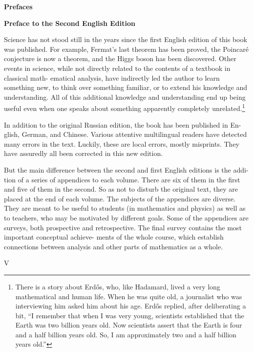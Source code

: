 \documentclass{article}
\begin{document}
\pagestyle{myheadings}

\begin{center}
{\Large \bfseries Prefaces}
\end{center}

\vspace{1cm}

{\large \bfseries Preface to the Second English Edition}

Science has not stood still in the years since the first English edition of this book
was published. For example, Fermat's last theorem has been proved, the Poincaré
conjecture is now a theorem, and the Higgs boson has been discovered. Other events
in science, while not directly related to the contents of a textbook in classical math-
ematical analysis, have indirectly led the author to learn something new, to think
over something familiar, or to extend his knowledge and understanding. All of this
additional knowledge and understanding end up being useful even when one speaks
about something apparently completely unrelated.\footnote{There is a story about Erd\H{o}s, who, like Hadamard, lived a very long mathematical and human life. When he was quite old, a journalist who was interviewing him asked him about his age. Erd\H{o}s replied, after deliberating a bit, ``I remember that when I was very young, scientists established that the Earth was two billion years old. Now scientists assert that the Earth is four and a half billion years old. So, I am approximately two and a half billion years old.''}

In addition to the original Russian edition, the book has been published in En-
glish, German, and Chinese. Various attentive multilingual readers have detected
many errors in the text. Luckily, these are local errors, mostly misprints. They have
assuredly all been corrected in this new edition.

But the main difference between the second and first English editions is the addi-
tion of a series of appendices to each volume. There are six of them in the first and
five of them in the second. So as not to disturb the original text, they are placed at the
end of each volume. The subjects of the appendices are diverse. They are meant to be
useful to students (in mathematics and physics) as well as to teachers, who may be
motivated by different goals. Some of the appendices are surveys, both prospective
and retrospective. The final survey contains the most important conceptual achieve-
ments of the whole course, which establish connections between analysis and other
parts of mathematics as a whole.

\vfill
\begin{flushright}
V
\end{flushright}
\end{document}
